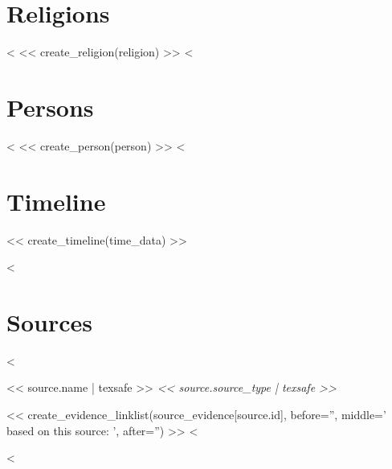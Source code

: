 \documentclass[fontsize=10pt,toc=chapterentrywithdots]{scrreprt}
\begin{document}
\clearpage
\chapter{Religions}
\label{sec:religions}

<%
  << create_religion(religion) >>
<%


\clearpage
\chapter{Persons}
\label{sec:persons}

<%
  << create_person(person) >>
<%


\clearpage
\chapter{Timeline}
\label{sec:timeline}

<< create_timeline(time_data) >>


<%
\clearpage
\chapter{Sources}
\label{sec:sources}

\begin{description}
    <%
  \item[\textsc{<< source.short | texsafe >>}]
      \hypertarget{source<<source.id>>}{<< source.name | texsafe >>
        \emph{<< source.source_type | texsafe >>}}

      << create_evidence_linklist(source_evidence[source.id], before='', middle=' based on this source: ', after='') >>
    <%
\end{description}
<%
\end{document}
